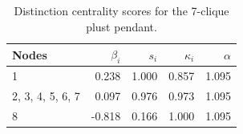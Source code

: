 \begin{table}
\centering
\caption{\label{tab:clique7pendant}Distinction centrality scores for the 7-clique plust pendant.}
\centering
\begin{tabular}[t]{lrrrr}
\toprule
Nodes & $\beta_i$ & $s_i$ & $\kappa_i$ & $\alpha$\\
\midrule
1 & 0.238 & 1.000 & 0.857 & 1.095\\
2, 3, 4, 5, 6, 7 & 0.097 & 0.976 & 0.973 & 1.095\\
8 & -0.818 & 0.166 & 1.000 & 1.095\\
\bottomrule
\end{tabular}
\end{table}
